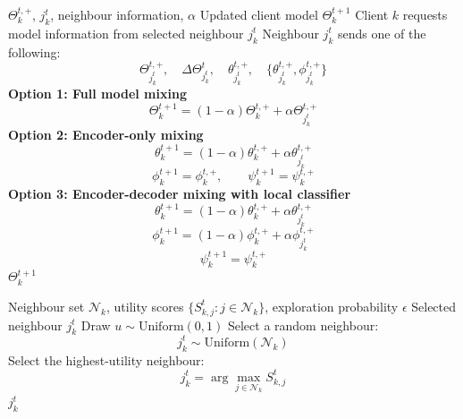 \documentclass[conference]{IEEEtran}
\begin{document}
\begin{algorithm}[t]
\caption{Peer Exchange and Model Mixing}
\label{alg:peer_exchange}
\footnotesize
\begin{algorithmic}[1]
\REQUIRE $\Theta_k^{t,+}$, $j_k^t$, neighbour information, $\alpha$
\ENSURE Updated client model $\Theta_k^{t+1}$
\STATE Client $k$ requests model information from selected neighbour $j_k^t$
\STATE Neighbour $j_k^t$ sends one of the following:
\begin{equation}
\Theta_{j_k^t}^{t,+},
\quad
\Delta\Theta_{j_k^t}^{t},
\quad
\theta_{j_k^t}^{t,+},
\quad
\{\theta_{j_k^t}^{t,+},\phi_{j_k^t}^{t,+}\}
\end{equation}
\STATE \textbf{Option 1: Full model mixing}
\begin{equation}
\Theta_k^{t+1}
=
(1-\alpha)\Theta_k^{t,+}
+
\alpha\Theta_{j_k^t}^{t,+}
\end{equation}
\STATE \textbf{Option 2: Encoder-only mixing}
\begin{equation}
\theta_k^{t+1}
=
(1-\alpha)\theta_k^{t,+}
+
\alpha\theta_{j_k^t}^{t,+}
\end{equation}
\begin{equation}
\phi_k^{t+1}=\phi_k^{t,+},
\qquad
\psi_k^{t+1}=\psi_k^{t,+}
\end{equation}
\STATE \textbf{Option 3: Encoder-decoder mixing with local classifier}
\begin{equation}
\theta_k^{t+1}
=
(1-\alpha)\theta_k^{t,+}
+
\alpha\theta_{j_k^t}^{t,+}
\end{equation}
\begin{equation}
\phi_k^{t+1}
=
(1-\alpha)\phi_k^{t,+}
+
\alpha\phi_{j_k^t}^{t,+}
\end{equation}
\begin{equation}
\psi_k^{t+1}
=
\psi_k^{t,+}
\end{equation}
\RETURN $\Theta_k^{t+1}$
\end{algorithmic}
\end{algorithm}


\begin{algorithm}[t]
\caption{$\epsilon$-Greedy Exploration-Aware Neighbour Selection}
\label{alg:epsilon_selection}
\footnotesize
\begin{algorithmic}[1]
\REQUIRE Neighbour set $\mathcal{N}_k$, utility scores $\{S_{k,j}^t:j\in\mathcal{N}_k\}$, exploration probability $\epsilon$
\ENSURE Selected neighbour $j_k^t$
\STATE Draw $u\sim \mathrm{Uniform}(0,1)$
    \STATE Select a random neighbour:
    \begin{equation}
j_k^t\sim \mathrm{Uniform}(\mathcal{N}_k)
\end{equation}
\ELSE
    \STATE Select the highest-utility neighbour:
    \begin{equation}
j_k^t
    =
    \arg\max_{j\in\mathcal{N}_k}
    S_{k,j}^{t}
\end{equation}
\ENDIF
\RETURN $j_k^t$
\end{algorithmic}
\end{algorithm}
\end{document}
